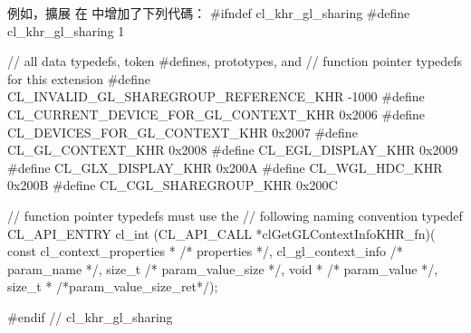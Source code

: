 例如，擴展  在  中增加了下列代碼：
\startclc
#ifndef cl_khr_gl_sharing
#define cl_khr_gl_sharing	1

// all data typedefs, token #defines, prototypes, and
// function pointer typedefs for this extension
#define CL_INVALID_GL_SHAREGROUP_REFERENCE_KHR	-1000
#define CL_CURRENT_DEVICE_FOR_GL_CONTEXT_KHR	0x2006
#define CL_DEVICES_FOR_GL_CONTEXT_KHR		0x2007
#define CL_GL_CONTEXT_KHR			0x2008
#define CL_EGL_DISPLAY_KHR			0x2009
#define CL_GLX_DISPLAY_KHR			0x200A
#define CL_WGL_HDC_KHR				0x200B
#define CL_CGL_SHAREGROUP_KHR			0x200C

// function pointer typedefs must use the
// following naming convention
typedef CL_API_ENTRY cl_int
	(CL_API_CALL *clGetGLContextInfoKHR_fn)(
		const cl_context_properties * /* properties */,
		cl_gl_context_info /* param_name */,
		size_t /* param_value_size */,
		void * /* param_value */,
		size_t * /*param_value_size_ret*/);

#endif // cl_khr_gl_sharing
\stopclc
